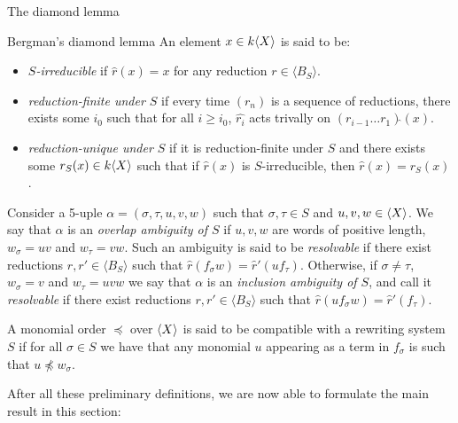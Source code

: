 \begin{chapter}{The diamond lemma}
\begin{section}{Bergman's diamond lemma}
An element $x\in k\langle X\rangle$ is said to be:
\begin{itemize}
\item \emph{$S$-irreducible} if $\hat{r}(x)=x$ for any reduction $r\in\langle B_S\rangle$.
\item \emph{reduction-finite under $S$} if every time $(r_n)$ is a sequence of reductions, there exists some $i_0$ such that for all $i\geq i_0$, $\hat{r_i}$ acts trivally on $({r_{i-1}}\dots r_1)\hat{}(x)$.
\item \emph{reduction-unique under $S$} if it is reduction-finite under $S$ and there exists some $r_S(x)\in k\langle X\rangle$ such that if $\hat{r}(x)$ is $S$-irreducible, then $\hat{r}(x) = r_S(x)$.
\end{itemize}

Consider a 5-uple $\alpha=(\sigma, \tau, u,v,w)$ such that $\sigma,\tau\in S$ and $u,v,w\in \langle X\rangle$. We say that $\alpha$ is an \emph{overlap ambiguity of $S$} if $u,v,w$ are words of positive length, $w_\sigma =uv$ and $w_\tau=vw$. Such an ambiguity is said to be \emph{resolvable} if there exist reductions $r,r'\in \langle B_S\rangle$ such that $\hat{r}(f_\sigma w)=\hat{r}'(uf_\tau)$. Otherwise, if $\sigma\neq \tau$, $w_\sigma=v$ and $w_\tau=uvw$ we say that $\alpha$ is an \emph{inclusion ambiguity of $S$}, and call it \emph{resolvable} if there exist reductions $r,r'\in \langle B_S\rangle$ such that $\hat{r}(uf_\sigma w)=\hat{r}'(f_\tau)$.

A monomial order $\preceq$ over $\langle X\rangle$ is said to be compatible with a rewriting system $S$ if for all $\sigma \in S$ we have that any monomial $u$ appearing as a term in $f_\sigma$ is such that $u\not\preceq w_\sigma$.

After all these preliminary definitions, we are now able to formulate the main result in this section:


\end{section}
\end{chapter}
